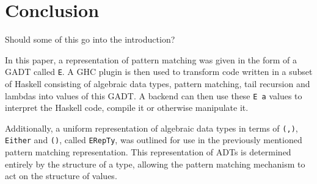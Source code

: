 \documentclass[runningheads, a4paper]{llncs}
\newenvironment{todo}
  {\ifthenelse{\isundefined{\showtodos}}{\comment}{\begin{tcolorbox}
    \textbf{TODO}:}}
  {\ifthenelse{\isundefined{\showtodos}}{\endcomment}{\end{tcolorbox}}
  }
\begin{document}
\section{Conclusion}

\begin{todo}
Should some of this go into the introduction?
\end{todo}

In this paper, a representation of pattern matching was given in the form of a
GADT called \verb|E|. A GHC plugin is then used to transform code written in a
subset of Haskell consisting of algebraic data types, pattern matching, tail
recursion and lambdas into values of this GADT. A backend can then use these
\verb|E a| values to interpret the Haskell code, compile it or otherwise
manipulate it.

Additionally, a uniform representation of algebraic data types in terms of
\verb|(,)|, \verb|Either| and \verb|()|, called \verb|ERepTy|, was outlined for
use in the previously mentioned pattern matching representation. This
representation of ADTs is determined entirely by the structure of a type,
allowing the pattern matching mechanism to act on the structure of values.





\end{document}
